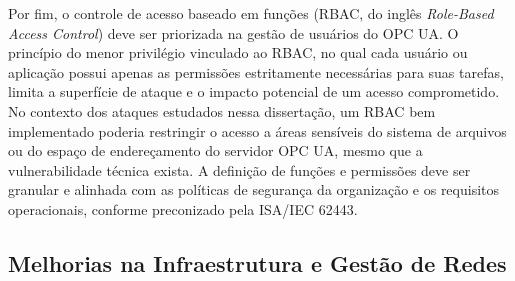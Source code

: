 
        Por fim, o controle de acesso baseado em funções (RBAC, do inglês \textit{Role-Based Access Control}) deve ser priorizada na gestão de usuários do OPC UA. O princípio do menor privilégio vinculado ao RBAC, no qual cada usuário ou aplicação possui apenas as permissões estritamente necessárias para suas tarefas, limita a superfície de ataque e o impacto potencial de um acesso comprometido. No contexto dos ataques estudados nessa dissertação, um RBAC bem implementado poderia restringir o acesso a áreas sensíveis do sistema de arquivos ou do espaço de endereçamento do servidor OPC UA, mesmo que a vulnerabilidade técnica exista. A definição de funções e permissões deve ser granular e alinhada com as políticas de segurança da organização e os requisitos operacionais, conforme preconizado pela ISA/IEC 62443.


    \subsection{Melhorias na Infraestrutura e Gestão de Redes}


